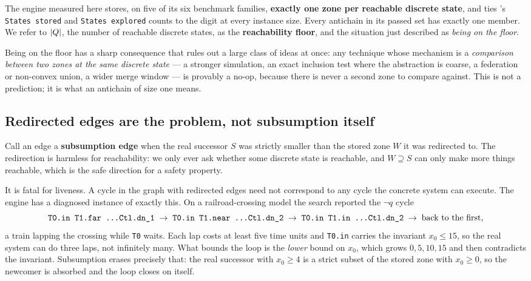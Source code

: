 The engine measured here stores, on five of its six benchmark families, \textbf{exactly one zone
per reachable discrete state}, and ties \verifyta{}'s \texttt{States stored} and
\texttt{States explored} counts to the digit at every instance size. Every antichain in its passed
set has exactly one member. We refer to $|Q|$, the number of reachable discrete states, as the
\textbf{reachability floor}, and the situation just described as \emph{being on the floor}.

Being on the floor has a sharp consequence that rules out a large class of ideas at once: any
technique whose mechanism is a \emph{comparison between two zones at the same discrete state} ---
a stronger simulation, an exact inclusion test where the abstraction is coarse, a federation or
non-convex union, a wider merge window --- is provably a no-op, because there is never a second
zone to compare against. This is not a prediction; it is what an antichain of size one means.

\subsection{Redirected edges are the problem, not subsumption itself}
\label{sec:setting:subedge}

Call an edge a \textbf{subsumption edge} when the real successor $S$ was strictly smaller than the
stored zone $W$ it was redirected to. The redirection is harmless for reachability: we only ever
ask whether some discrete state is reachable, and $W \supseteq S$ can only make more things
reachable, which is the safe direction for a safety property.

It is fatal for liveness. A cycle in the graph with redirected edges need not correspond to any
cycle the concrete system can execute. The engine has a diagnosed instance of exactly this. On a
railroad-crossing model the search reported the $\lnot q$ cycle
\[
  \texttt{T0.in T1.far \dots Ctl.dn\_1} \;\to\; \texttt{T0.in T1.near \dots Ctl.dn\_2}
  \;\to\; \texttt{T0.in T1.in \dots Ctl.dn\_2} \;\to\; \text{back to the first,}
\]
a train lapping the crossing while \texttt{T0} waits. Each lap costs at least five time units and
\texttt{T0.in} carries the invariant $x_0 \le 15$, so the real system can do three laps, not
infinitely many. What bounds the loop is the \emph{lower} bound on $x_0$, which grows
$0, 5, 10, 15$ and then contradicts the invariant. Subsumption erases precisely that: the real
successor with $x_0 \ge 4$ is a strict subset of the stored zone with $x_0 \ge 0$, so the newcomer
is absorbed and the loop closes on itself.

